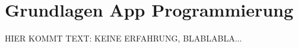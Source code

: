 \chapter{Grundlagen App Programmierung}
\label{sec:GrundlagenAppProgrammierung}


HIER KOMMT TEXT: KEINE ERFAHRUNG, BLABLABLA...









